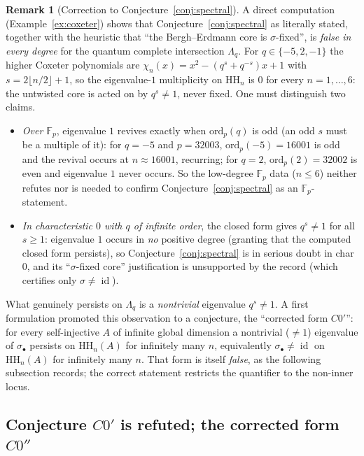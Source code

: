 \documentclass[11pt]{amsart}
\theoremstyle{definition}
\newtheorem{remark}[theorem]{Remark}
\newcommand{\HH}{\mathrm{HH}}
\newcommand{\id}{\operatorname{id}}
\newcommand{\Fp}{\mathbb{F}_p}
\begin{document}
\begin{remark}[Correction to Conjecture~\ref{conj:spectral}]\label{rem:C0correction}
A direct computation (Example~\ref{ex:coxeter}) shows that
Conjecture~\ref{conj:spectral} as literally stated, together with the heuristic
that ``the Bergh--Erdmann core is $\sigma$-fixed'', is \emph{false in every
degree} for the quantum complete intersection $\Lambda_q$. For
$q\in\{-5,2,-1\}$ the higher Coxeter polynomials are
$\chi_n(x)=x^2-(q^s+q^{-s})x+1$ with $s=2\lfloor n/2\rfloor+1$, so the
eigenvalue-$1$ multiplicity on $\HH_n$ is $0$ for every $n=1,\dots,6$: the
untwisted core is acted on by $q^{s}\ne1$, never fixed. One must distinguish
two claims.
\begin{itemize}
\item \emph{Over $\Fp$}, eigenvalue $1$ revives exactly when
$\mathrm{ord}_p(q)$ is odd (an odd $s$ must be a multiple of it): for $q=-5$
and $p=32003$, $\mathrm{ord}_p(-5)=16001$ is odd and the revival occurs at
$n\approx16001$, recurring; for $q=2$, $\mathrm{ord}_p(2)=32002$ is even
and eigenvalue $1$ never occurs. So the low-degree $\Fp$ data ($n\le6$) neither
refutes nor is needed to confirm Conjecture~\ref{conj:spectral} as an
$\Fp$-statement.
\item \emph{In characteristic $0$ with $q$ of infinite order}, the closed form
gives $q^s\ne1$ for all $s\ge1$: eigenvalue $1$ occurs in \emph{no} positive
degree (granting that the computed closed form persists), so
Conjecture~\ref{conj:spectral} is in serious doubt in char $0$, and its
``$\sigma$-fixed core'' justification is unsupported by the record (which
certifies only $\sigma\ne\id$).
\end{itemize}
What genuinely persists on $\Lambda_q$ is a \emph{nontrivial} eigenvalue
$q^{s}\ne1$. A first formulation promoted this observation
to a conjecture, the ``corrected form $C0'$'': for every self-injective $A$ of
infinite global dimension a nontrivial ($\ne1$) eigenvalue of $\sigma_\bullet$
persists on $\HH_n(A)$ for infinitely many $n$, equivalently $\sigma_\bullet\ne\id$
on $\HH_n(A)$ for infinitely many $n$. That form is itself \emph{false}, as the
following subsection records; the correct statement restricts the quantifier to
the non-inner locus.
\end{remark}

\subsection{Conjecture $C0'$ is refuted; the corrected form $C0''$}\label{subsec:C0}
\end{document}

